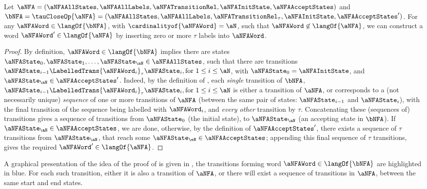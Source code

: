 \begin{lemma}\label{lem:removeTaus}
    Let $\aNFA = ( \aNFAAllStates
                 , \aNFAAllLabels
                 , \aNFATransitionRel
                 , \aNFAInitState
                 , \aNFAAcceptStates
                 )$ and $\bNFA = \tauCloseOp{\aNFA} =
                    ( \aNFAAllStates
                    , \aNFAAllLabels
                    , \aNFATransitionRel_\tau
                    , \aNFAInitState
                    , \aNFAAcceptStates'
                    )$.
For any $\aNFAWord \in \langOf{\bNFA}$, with $\cardinalityof{\aNFAWord} = \aN$,
such that $\aNFAWord \not\in \langOf{\aNFA}$, we can construct a word
$\aNFAWord' \in \langOf{\aNFA}$ by inserting zero or more $\tau$ labels into
$\aNFAWord$.
\end{lemma}
\begin{proof}
By definition, $\aNFAWord \in \langOf{\bNFA}$ implies there are states
$\aNFAState_0, \aNFAState_1, \dots, \aNFAState_\aN \in \aNFAAllStates$, such
that there are transitions $\aNFAState_{i - 1}
\LabelledTrans{\aNFAWord_i}_{\tau} \aNFAState_i, \text{for } 1
\le i \le \aN$, with $\aNFAState_0 = \aNFAInitState$, and $\aNFAState_\aN \in
\aNFAAcceptStates'$. Indeed, by the definition of \tauClosure{}, each
\emph{single} transition of $\bNFA$, $\aNFAState_{i - 1}
\LabelledTrans{\aNFAWord_i}_{\tau} \aNFAState_i, \text{for } 1
\le i \le \aN$ is either a transition of $\aNFA$, or corresponds to a (not
necessarily unique) \emph{sequence} of one or more transitions of $\aNFA$
(between the same pair of states: $\aNFAState_{i - 1}$ and $\aNFAState_i$),
with the final transition of the sequence being labelled with $\aNFAWord_i$,
and \emph{every other} transition by $\tau$. Concatenating these (sequences of)
transitions gives a sequence of transitions from $\aNFAState_0$ (the initial
state), to $\aNFAState_\aN$ (an accepting state in $\bNFA$). If $\aNFAState_\aN
\in \aNFAAcceptStates$, we are done, otherwise, by the definition of
$\aNFAAcceptStates'$, there exists a sequence of $\tau$ transitions from
$\aNFAState_\aN$, that reach some $\aNFAState_\eN \in \aNFAAcceptStates$;
appending this final sequence of $\tau$ transitions, gives the required
$\aNFAWord' \in \langOf{\aNFA}$.
\end{proof}

A graphical presentation of the idea of the proof of  is
given in , the transitions forming word $\aNFAWord
\in \langOf{\bNFA}$ are highlighted in blue. For each such transition, either
it is also a transition of $\aNFA$, or there will exist a sequence of
transitions in $\aNFA$, between the same start and end states.

